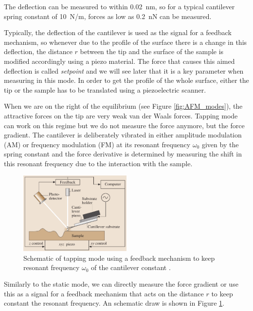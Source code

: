 \documentclass[11pt,a4paper]{article}
\begin{document}
The deflection can be measured to within \SI{0.02}{\nm}, so for a typical cantilever spring constant of \SI{10}{\N/\m}, forces as low as \SI{0.2}{\nano\N} can be measured.

Typically, the deflection of the cantilever is used as the signal for a feedback mechanism, so whenever due to the profile of the surface there is a change in this deflection, the distance $r$ between the tip and the surface of the sample is modified accordingly using a piezo material. The force that causes this aimed deflection is called \emph{setpoint} and we will see later that it is a key parameter when measuring in this mode. In order to get the profile of the whole surface, either the tip or the sample has to be translated using a piezoelectric scanner.

When we are on the right of the equilibrium (see Figure \ref{fig:AFM_modes}), the attractive forces on the tip are very weak van der Waals forces. Tapping mode can work on this regime but we do not measure the force anymore, but the force gradient. The cantilever is deliberately vibrated in either amplitude modulation (AM) or frequency modulation (FM) at its resonant frequency $\omega_0$ given by the spring constant and the force derivative is determined by measuring the shift in this resonant frequency due to the interaction with the sample.

\begin{figure}[ht]
\centering
\includegraphics[width=0.5\textwidth]{Tapping_mode}
\caption{Schematic of tapping mode using a feedback mechanism to keep resonant frequency $\omega_0$ of the cantilever constant \cite{Bhushan}.}
\label{fig:Deflection_measurement}
\end{figure}

Similarly to the static mode, we can directly measure the force gradient or use this as a signal for a feedback mechanism that acts on the distance $r$ to keep constant the resonant frequency. An schematic draw is shown in Figure \ref{fig:Deflection_measurement}.
\end{document}
